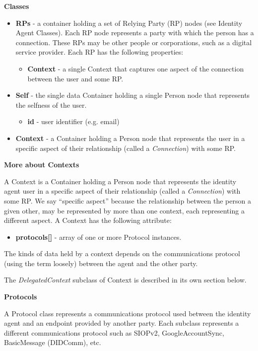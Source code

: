 \documentclass[11pt, oneside]{article}   	%
\begin{document}
\textbf{Classes}

\begin{itemize}
	\item \textbf{RPs} - a container holding a set of Relying Party (RP) nodes (see Identity Agent Classes). Each RP node represents a party with which the person has a connection. These RPs may be other people or corporations, such as a digital service provider. Each RP has the following properties:
	\begin{itemize}
		\item \textbf{Context} - a single Context that captures one aspect of the connection between the user and some RP.
	\end{itemize}
	\item \textbf{Self} - the single data Container holding a single Person node that represents the selfness of the user.
	\begin{itemize}
		\item \textbf{id} - user identifier (e.g. email)
	\end{itemize}
	\item \textbf{Context} - a Container holding a Person node that represents the user in a specific aspect of their relationship (called a \emph{Connection}) with some RP. 
\end{itemize}

\textbf{More about Contexts}

A Context is a Container holding a Person node that represents the identity agent user in a specific aspect of their relationship (called a \emph{Connection}) with some RP. We say ``specific aspect'' because the relationship between the person a given other, may be represented by more than one context, each representing a different aspect. A Context has the following attribute:

\begin{itemize}
\item \textbf{protocols[]} - array of one or more Protocol instances.
\end{itemize}

The kinds of data held by a context depends on the communications protocol (using the term loosely) between the agent and the other party. 

The \emph{DelegatedContext} subclass of Context is described in its own section below.

\textbf{Protocols}

A Protocol class represents a communications protocol used between the identity agent and an endpoint provided by another party. Each subclass represents a different communications protocol such as SIOPv2, GoogleAccountSync, BasicMessage (DIDComm), etc.  
\end{document}
